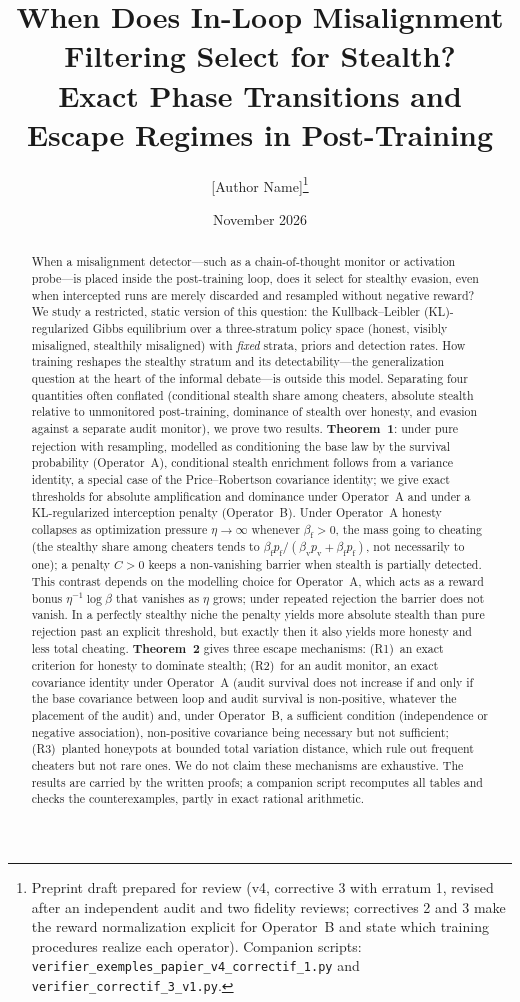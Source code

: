 \documentclass[11pt,a4paper]{article}
\title{When Does In-Loop Misalignment Filtering Select for Stealth?\\
Exact Phase Transitions and Escape Regimes in Post-Training}
\author{[Author Name]\thanks{Preprint draft prepared for review (v4, corrective 3 with erratum 1, revised after an independent audit and two fidelity reviews; correctives 2 and 3 make the reward normalization explicit for Operator~B and state which training procedures realize each operator). Companion scripts: \texttt{verifier\_exemples\_papier\_v4\_correctif\_1.py} and \texttt{verifier\_correctif\_3\_v1.py}.}}
\date{November 2026}
\begin{document}
\maketitle

\begin{abstract}
When a misalignment detector---such as a chain-of-thought monitor or activation probe---is placed inside the post-training loop, does it select for stealthy evasion, even when intercepted runs are merely discarded and resampled without negative reward? We study a restricted, static version of this question: the Kullback--Leibler (KL)-regularized Gibbs equilibrium over a three-stratum policy space (honest, visibly misaligned, stealthily misaligned) with \emph{fixed} strata, priors and detection rates. How training reshapes the stealthy stratum and its detectability---the generalization question at the heart of the informal debate---is outside this model. Separating four quantities often conflated (conditional stealth share among cheaters, absolute stealth relative to unmonitored post-training, dominance of stealth over honesty, and evasion against a separate audit monitor), we prove two results. \textbf{Theorem~1}: under pure rejection with resampling, modelled as conditioning the base law by the survival probability (Operator~A), conditional stealth enrichment follows from a variance identity, a special case of the Price--Robertson covariance identity; we give exact thresholds for absolute amplification and dominance under Operator~A and under a KL-regularized interception penalty (Operator~B). Under Operator~A honesty collapses as optimization pressure $\eta \to \infty$ whenever $\beta_{\mathrm{f}} > 0$, the mass going to cheating (the stealthy share among cheaters tends to $\beta_{\mathrm{f}}p_{\mathrm{f}}/(\beta_{\mathrm{v}}p_{\mathrm{v}}+\beta_{\mathrm{f}}p_{\mathrm{f}})$, not necessarily to one); a penalty $C>0$ keeps a non-vanishing barrier when stealth is partially detected. This contrast depends on the modelling choice for Operator~A, which acts as a reward bonus $\eta^{-1}\log\beta$ that vanishes as $\eta$ grows; under repeated rejection the barrier does not vanish. In a perfectly stealthy niche the penalty yields more absolute stealth than pure rejection past an explicit threshold, but exactly then it also yields more honesty and less total cheating. \textbf{Theorem~2} gives three escape mechanisms: (R1)~an exact criterion for honesty to dominate stealth; (R2)~for an audit monitor, an exact covariance identity under Operator~A (audit survival does not increase if and only if the base covariance between loop and audit survival is non-positive, whatever the placement of the audit) and, under Operator~B, a sufficient condition (independence or negative association), non-positive covariance being necessary but not sufficient; (R3)~planted honeypots at bounded total variation distance, which rule out frequent cheaters but not rare ones. We do not claim these mechanisms are exhaustive. The results are carried by the written proofs; a companion script recomputes all tables and checks the counterexamples, partly in exact rational arithmetic.
\end{abstract}
\end{document}

